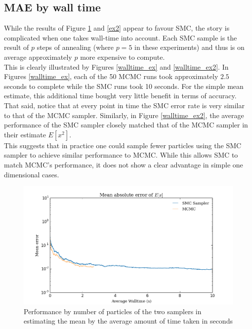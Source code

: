 \documentclass[12pt]{elsarticle}
\begin{document}
\subsection*{MAE by wall time}

While the results of Figure \ref{ex} and \ref{ex2} appear to favour SMC, the story is complicated when one takes wall-time into account. Each SMC sample is the result of $p$ steps of annealing (where $p=5$ in these experiments) and thus is on average approximately $p$ more expensive to compute. \\

This is clearly illustrated by Figures \ref{walltime_ex} and  \ref{walltime_ex2}. In Figures \ref{walltime_ex}, each of the 50 MCMC runs took approximately $2.5$ seconds to complete while the SMC runs took 10 seconds. For the simple mean estimate, this additional time bought very little benefit in terms of accuracy. That said, notice that at every point in time the SMC error rate is very similar to that of the MCMC sampler. Similarly, in Figure \ref{walltime_ex2}, the average performance of the SMC sampler closely matched that of the MCMC sampler in their estimate $E[x^2]$. \\

This suggests that in practice one could sample fewer particles using the SMC sampler to achieve similar performance to MCMC. While this allows SMC to match MCMC's performance, it does not show a clear advantage in simple one dimensional cases.


\begin{figure}[htbp]
\begin{center}
\includegraphics[width = \textwidth]{plots/E_X_walltime.png}
\caption{Performance by number of particles of the two samplers in estimating the mean by the average amount of time taken in seconds}
\label{ex}
\end{center}
\end{figure}
\end{document}
